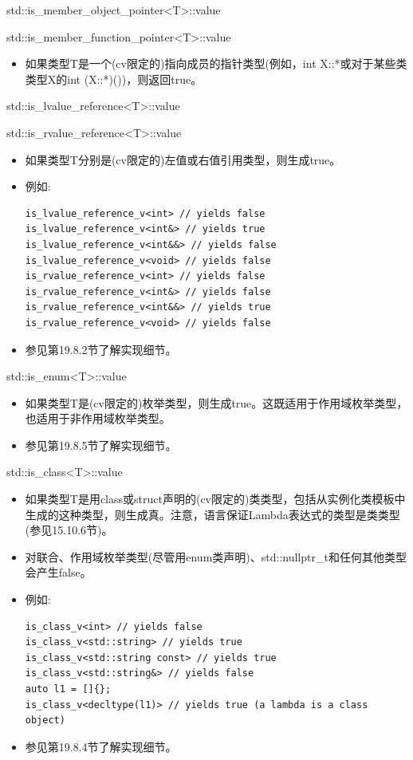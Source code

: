 std::is\_member\_object\_pointer<T>::value

std::is\_member\_function\_pointer<T>::value

\begin{itemize}
\item 
如果类型T是一个(cv限定的)指向成员的指针类型(例如，int X::*或对于某些类类型X的int (X::*)())，则返回true。
\end{itemize}

std::is\_lvalue\_reference<T>::value

std::is\_rvalue\_reference<T>::value

\begin{itemize}
\item 
如果类型T分别是(cv限定的)左值或右值引用类型，则生成true。

\item 
例如:
\begin{lstlisting}[style=styleCXX]
is_lvalue_reference_v<int> // yields false
is_lvalue_reference_v<int&> // yields true
is_lvalue_reference_v<int&&> // yields false
is_lvalue_reference_v<void> // yields false
is_rvalue_reference_v<int> // yields false
is_rvalue_reference_v<int&> // yields false
is_rvalue_reference_v<int&&> // yields true
is_rvalue_reference_v<void> // yields false
\end{lstlisting}

\item 
参见第19.8.2节了解实现细节。
\end{itemize}

std::is\_enum<T>::value

\begin{itemize}
\item 
如果类型T是(cv限定的)枚举类型，则生成true。这既适用于作用域枚举类型，也适用于非作用域枚举类型。

\item 
参见第19.8.5节了解实现细节。
\end{itemize}

std::is\_class<T>::value

\begin{itemize}
\item 
如果类型T是用class或struct声明的(cv限定的)类类型，包括从实例化类模板中生成的这种类型，则生成真。注意，语言保证Lambda表达式的类型是类类型(参见15.10.6节)。

\item 
对联合、作用域枚举类型(尽管用enum类声明)、std::nullptr\_t和任何其他类型会产生false。

\item 
例如:
\begin{lstlisting}[style=styleCXX]
is_class_v<int> // yields false
is_class_v<std::string> // yields true
is_class_v<std::string const> // yields true
is_class_v<std::string&> // yields false
auto l1 = []{};
is_class_v<decltype(l1)> // yields true (a lambda is a class object)
\end{lstlisting}

\item 
参见第19.8.4节了解实现细节。
\end{itemize}

